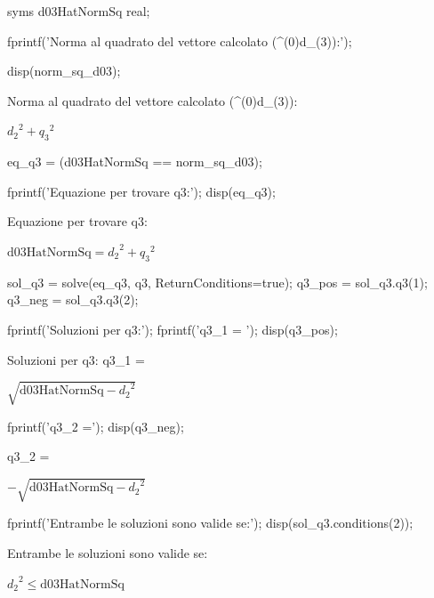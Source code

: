 \documentclass[11pt, a4paper]{article}
\begin{document}
\begin{matlabcode}
syms d03HatNormSq real;

fprintf('Norma al quadrato del vettore calcolato (^(0)d_(3)):');

disp(norm_sq_d03);
\end{matlabcode}
\begin{matlaboutput}
Norma al quadrato del vettore calcolato (^(0)d_(3)):
\end{matlaboutput}
\begin{matlabsymbolicoutput}
$\displaystyle {d_2 }^2 +{q_3 }^2 $
\end{matlabsymbolicoutput}
\newpage
\begin{matlabcode}
eq_q3 = (d03HatNormSq == norm_sq_d03);

fprintf('Equazione per trovare q3:');
disp(eq_q3);
\end{matlabcode}
\begin{matlaboutput}
Equazione per trovare q3:
\end{matlaboutput}
\begin{matlabsymbolicoutput}
$\displaystyle \textrm{d03HatNormSq}={d_2 }^2 +{q_3 }^2 $
\end{matlabsymbolicoutput}
\begin{matlabcode}

sol_q3 = solve(eq_q3, q3, ReturnConditions=true);
q3_pos = sol_q3.q3(1);
q3_neg = sol_q3.q3(2);

fprintf('Soluzioni per q3:');
fprintf('q3_1 = ');
disp(q3_pos);
\end{matlabcode}
\begin{matlaboutput}
Soluzioni per q3:
q3_1 =
\end{matlaboutput}
\begin{matlabsymbolicoutput}
$\displaystyle \sqrt{\textrm{d03HatNormSq}-{d_2 }^2 }$
\end{matlabsymbolicoutput}
\begin{matlabcode}
fprintf('q3_2 =');
disp(q3_neg);
\end{matlabcode}
\begin{matlaboutput}
q3_2 =
\end{matlaboutput}
\begin{matlabsymbolicoutput}
$\displaystyle -\sqrt{\textrm{d03HatNormSq}-{d_2 }^2 }$
\end{matlabsymbolicoutput}
\begin{matlabcode}
fprintf('Entrambe le soluzioni sono valide se:');
disp(sol_q3.conditions(2));
\end{matlabcode}
\begin{matlaboutput}
Entrambe le soluzioni sono valide se:
\end{matlaboutput}
\begin{matlabsymbolicoutput}
$\displaystyle {d_2 }^2 \le \textrm{d03HatNormSq}$
\end{matlabsymbolicoutput}
\end{document}
